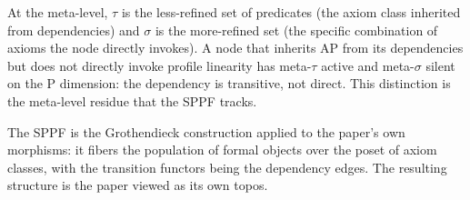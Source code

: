 At the meta-level, $\tau$ is the less-refined set of
predicates (the axiom class inherited from dependencies)
and $\sigma$ is the more-refined set (the specific
combination of axioms the node directly invokes). A node
that inherits \textsf{AP} from its dependencies but does
not directly invoke profile linearity has meta-$\tau$
active and meta-$\sigma$ silent on the \textsf{P}
dimension: the dependency is transitive, not direct. This
distinction is the meta-level residue that the SPPF tracks.

The SPPF is the Grothendieck construction applied to the
paper's own morphisms: it fibers the population of formal
objects over the poset of axiom classes, with the
transition functors being the dependency edges. The
resulting structure is the paper viewed as its own topos.
